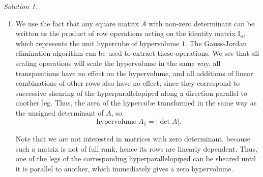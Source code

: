 \documentclass[11pt]{report}
\theoremstyle{remark}
\newtheorem*{solution}{Solution}
\begin{document}
\begin{solution}
\begin{enumerate}
            \item We use the fact that any square matrix $A$ with non-zero
            determinant can be written as the product of row operations acting on
            the identity matrix $\mathbb{I}_n$, which represents the unit hypercube of
            hypervolume $1$. The Gauss-Jordan elimination algorithm can be used to
            extract these operations. We see that all scaling operations will scale
            the hypervolume in the same way, all transpositions have no effect on
            the hypervolume, and all additions of linear combinations of other rows
            also have no effect, since they correspond to successive shearing of the
            hyperparallelopiped along a direction parallel to another leg. Thus, the
            area of the hypercube transformed in the same way as the unsigned
            determinant of $A$, so \[
                \operatorname{hypervolume} A_{\parallel} = |\det{A}|.
            \] 

            Note that we are not interested in matrices
            with zero determinant, because such a matrix is not of full rank, 
            hence its rows are linearly dependent. Thus, one of the legs of the
            corresponding hyperparallelopiped can be sheared until it is parallel to
            another, which immediately gives a zero hypervolume.
    \end{enumerate}
    \end{solution}
\end{document}
